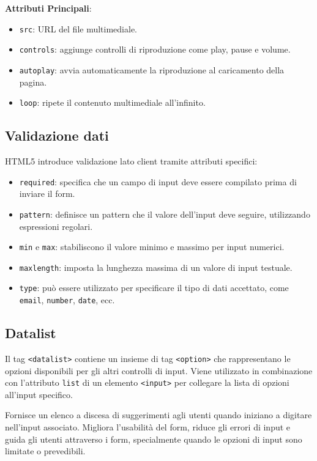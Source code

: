 \textbf{Attributi Principali}:
\begin{itemize}
    \item \texttt{src}: URL del file multimediale.
    \item \texttt{controls}: aggiunge controlli di riproduzione come play, pause e volume.
    \item \texttt{autoplay}: avvia automaticamente la riproduzione al caricamento della pagina.
    \item \texttt{loop}: ripete il contenuto multimediale all'infinito.
\end{itemize}

\subsection{Validazione dati}

HTML5 introduce validazione lato client tramite attributi specifici:
\begin{itemize}
    \item \texttt{required}: specifica che un campo di input deve essere compilato prima di inviare il form.
    \item \texttt{pattern}: definisce un pattern che il valore dell'input deve seguire, utilizzando espressioni regolari.
    \item \texttt{min} e \texttt{max}: stabiliscono il valore minimo e massimo per input numerici.
    \item \texttt{maxlength}: imposta la lunghezza massima di un valore di input testuale.
    \item \texttt{type}: può essere utilizzato per specificare il tipo di dati accettato, come \texttt{email}, \texttt{number}, \texttt{date}, ecc.
\end{itemize}

\subsection{Datalist}

Il tag \texttt{<datalist>} contiene un insieme di tag \texttt{<option>} che rappresentano le opzioni disponibili per gli altri controlli di input. Viene utilizzato in combinazione con l'attributo \texttt{list} di un elemento \texttt{<input>} per collegare la lista di opzioni all'input specifico.

Fornisce un elenco a discesa di suggerimenti agli utenti quando iniziano a digitare nell'input associato. Migliora l'usabilità del form, riduce gli errori di input e guida gli utenti attraverso i form, specialmente quando le opzioni di input sono limitate o prevedibili.
